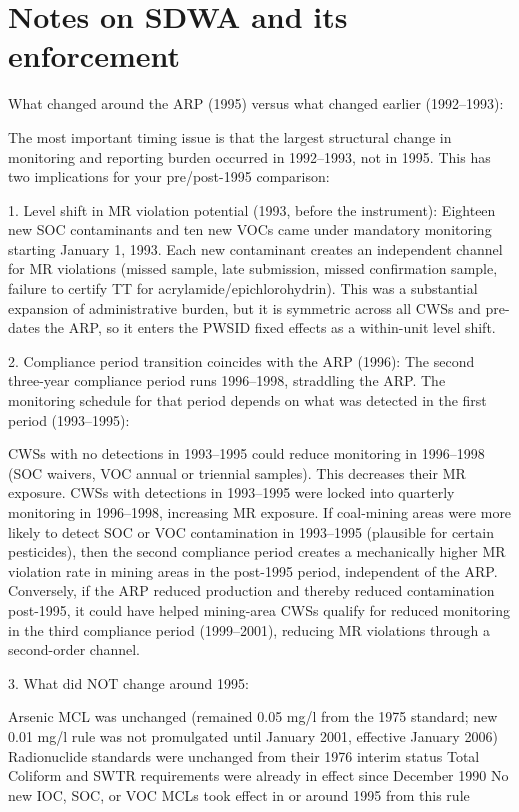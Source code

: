 \section{Notes on SDWA and its enforcement}
What changed around the ARP (1995) versus what changed earlier (1992–1993):

The most important timing issue is that the largest structural change in monitoring and reporting burden occurred in 1992–1993, not in 1995. This has two implications for your pre/post-1995 comparison:

1. Level shift in MR violation potential (1993, before the instrument):
Eighteen new SOC contaminants and ten new VOCs came under mandatory monitoring starting January 1, 1993. Each new contaminant creates an independent channel for MR violations (missed sample, late submission, missed confirmation sample, failure to certify TT for acrylamide/epichlorohydrin). This was a substantial expansion of administrative burden, but it is symmetric across all CWSs and pre-dates the ARP, so it enters the PWSID fixed effects as a within-unit level shift.

2. Compliance period transition coincides with the ARP (1996):
The second three-year compliance period runs 1996–1998, straddling the ARP. The monitoring schedule for that period depends on what was detected in the first period (1993–1995):

CWSs with no detections in 1993–1995 could reduce monitoring in 1996–1998 (SOC waivers, VOC annual or triennial samples). This decreases their MR exposure.
CWSs with detections in 1993–1995 were locked into quarterly monitoring in 1996–1998, increasing MR exposure.
If coal-mining areas were more likely to detect SOC or VOC contamination in 1993–1995 (plausible for certain pesticides), then the second compliance period creates a mechanically higher MR violation rate in mining areas in the post-1995 period, independent of the ARP. Conversely, if the ARP reduced production and thereby reduced contamination post-1995, it could have helped mining-area CWSs qualify for reduced monitoring in the third compliance period (1999–2001), reducing MR violations through a second-order channel.

3. What did NOT change around 1995:

Arsenic MCL was unchanged (remained 0.05 mg/l from the 1975 standard; new 0.01 mg/l rule was not promulgated until January 2001, effective January 2006)
Radionuclide standards were unchanged from their 1976 interim status
Total Coliform and SWTR requirements were already in effect since December 1990
No new IOC, SOC, or VOC MCLs took effect in or around 1995 from this rule


